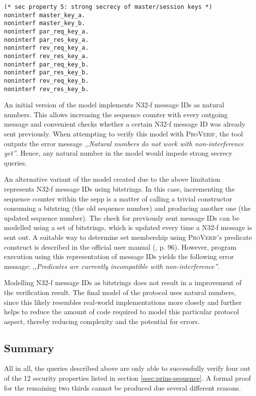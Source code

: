 \begin{lstlisting}[caption={Query for security property 5},label={lst:query-sec-5},firstnumber=221]
(* sec property 5: strong secrecy of master/session keys *)
noninterf master_key_a.
noninterf master_key_b.
noninterf par_req_key_a.
noninterf par_res_key_a.
noninterf rev_req_key_a.
noninterf rev_res_key_a.
noninterf par_req_key_b.
noninterf par_res_key_b.
noninterf rev_req_key_b.
noninterf rev_res_key_b.
\end{lstlisting}

An initial version of the model implements N32-f message IDs as natural numbers.
This allows increasing the sequence counter with every outgoing message and convenient checks whether a certain N32-f message ID was already sent previously.
When attempting to verify this model with \textsc{ProVerif}, the tool outputs the error message \textit{,,Natural numbers do not work with non-interference yet''}.
Hence, any natural number in the model would impede strong secrecy queries.

An alternative variant of the model created due to the above limitation represents N32-f message IDs using bitstrings.
In this case, incrementing the sequence counter within the \gls{sepp} is a matter of calling a trivial constructor consuming a bitstring (the old sequence number) and producing another one (the updated sequence number).
The check for previously sent message IDs can be modelled using a set of bitstrings, which is updated every time a N32-f message is sent out.
A suitable way to determine set membership using \textsc{ProVerif}'s {\sffamily predicate} construct is described in the official user manual (\cite{blanchet2020proverif}, p. 96).
However, program execution using this representation of message IDs yields the following error message: \textit{,,Predicates are currently incompatible with non-interference''}.

Modelling N32-f message IDs as bitstrings does not result in a improvement of the verification result.
The final model of the protocol uses natural numbers, since this likely resembles real-world implementations more closely and further helps to reduce the amount of code required to model this particular protocol aspect, thereby reducing complexity and the potential for errors.

\subsection{Summary}

All in all, the queries described above are only able to successfully verify four out of the 12 security properties listed in section \ref{ssec:prins-sequence}.
A formal proof for the remaining two thirds cannot be produced due several different reasons.

